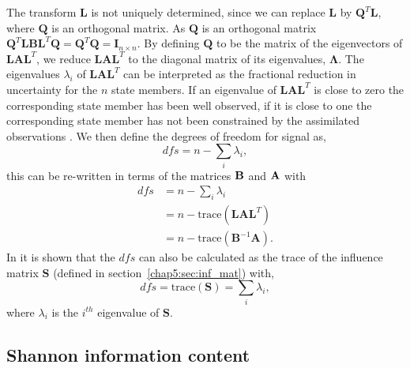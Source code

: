 The transform $\textbf{L}$ is not uniquely determined, since we can replace $\textbf{L}$ by $\textbf{Q}^{T}\textbf{L}$, where $\textbf{Q}$ is an orthogonal matrix. As \(\textbf{Q}\) is an orthogonal matrix $\textbf{Q}^{T}\textbf{L}\textbf{B}\textbf{L}^{T}\textbf{Q} = \textbf{Q}^{T}\textbf{Q} = \textbf{I}_{n \times n}$. By defining $\textbf{Q}$ to be the matrix of the eigenvectors of $\textbf{L}\textbf{A}\textbf{L}^{T}$, we reduce $\textbf{L}\textbf{A}\textbf{L}^{T}$ to the diagonal matrix of its eigenvalues, $\bm{\Lambda}$. The eigenvalues $\lambda_{i}$ of $\textbf{L}\textbf{A}\textbf{L}^{T}$ can be interpreted as the fractional reduction in uncertainty for the $n$ state members. If an eigenvalue of $\textbf{L}\textbf{A}\textbf{L}^{T}$ is close to zero the corresponding state member has been well observed, if it is close to one the corresponding state member has not been constrained by the assimilated observations \citep{stewart2008correlated}. We then define the degrees of freedom for signal as,
\begin{equation}
dfs = n - \sum_i \lambda_{i},
\end{equation}
this can be re-written in terms of the matrices $\bf{B}$ and $\bf{A}$ with
\begin{equation}
\begin{split}
dfs & = n - \sum_i \lambda_{i} \\
       & = n - \text{trace}(\textbf{L}\textbf{A}\textbf{L}^{T}) \\
       & = n - \text{trace}(\mathbf{B}^{-1}\mathbf{A}). \label{chap5:eqn:dfs}
\end{split}
\end{equation}
In \citet{rodgers2000inverse} it is shown that the $dfs$ can also be calculated as the trace of the influence matrix $\textbf{S}$ (defined in section~\ref{chap5:sec:inf_mat}) with,
\begin{equation}
dfs = \text{trace}(\textbf{S}) = \sum_{i} \lambda_{i},
\end{equation}
where $\lambda_{i}$ is the $i^{th}$ eigenvalue of $\textbf{S}$.

\subsection{Shannon information content}%

